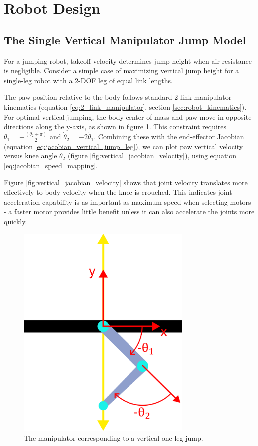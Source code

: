 \section{Robot Design}
\label{sec:robot_design}

\subsection{The Single Vertical Manipulator Jump Model}

For a jumping robot, takeoff velocity determines jump height when air resistance is negligible. Consider a simple case of maximizing vertical jump height for a single-leg robot with a 2-DOF leg of equal link lengths.

The paw position relative to the body follows standard 2-link manipulator kinematics (equation \ref{eq:2_link_manipulator}, section \ref{sec:robot_kinematics}). For optimal vertical jumping, the body center of mass and paw move in opposite directions along the y-axis, as shown in figure \ref{fig:vertical_manipulator}. This constraint requires $\theta_1 = -\frac{(\theta_2+\pi)}{2}$ and $\dot{\theta}_2=-2\dot{\theta}_1$. Combining these with the end-effector Jacobian (equation \ref{eq:jacobian_vertical_jump_leg}), we can plot paw vertical velocity versus knee angle $\theta_2$ (figure \ref{fig:vertical_jacobian_velocity}), using equation \ref{eq:jacobian_speed_mapping}. 

Figure \ref{fig:vertical_jacobian_velocity} shows that joint velocity translates more effectively to body velocity when the knee is crouched. This indicates joint acceleration capability is as important as maximum speed when selecting motors - a faster motor provides little benefit unless it can also accelerate the joints more quickly.

\begin{figure}[h]
    \centering
    \includegraphics[width=0.75\textwidth]{Images/one_axis_jump.png}
    \caption{The manipulator corresponding to a vertical one leg jump.}
    \label{fig:vertical_manipulator}
\end{figure}

